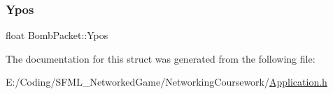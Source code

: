 \hypertarget{struct_bomb_packet_a5279e358c68ee4506035cb2855352955}{}\label{struct_bomb_packet_a5279e358c68ee4506035cb2855352955} 
\subsubsection{\texorpdfstring{Ypos}{Ypos}}
{\footnotesize\ttfamily float Bomb\+Packet\+::\+Ypos}



The documentation for this struct was generated from the following file\+:\begin{DoxyCompactItemize}
\item 
E\+:/\+Coding/\+S\+F\+M\+L\+\_\+\+Networked\+Game/\+Networking\+Coursework/\hyperlink{_application_8h}{Application.\+h}\end{DoxyCompactItemize}
